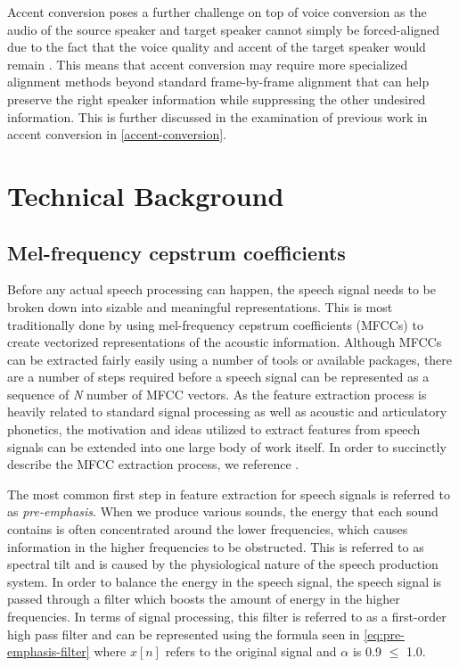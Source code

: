 \documentclass
[
    a4paper,
    twoside,
    12pt,
]
{report}
\begin{document}
Accent conversion poses a further challenge on top of voice conversion
as the audio of the source speaker and target speaker cannot simply be
forced-aligned due to the fact that the voice quality and accent of the
target speaker would remain \parencite{aryal2014}. This means that
accent conversion may require more specialized alignment methods beyond
standard frame-by-frame alignment that can help preserve the right
speaker information while suppressing the other undesired information.
This is further discussed in the examination of previous work in accent
conversion in \autoref{accent-conversion}.

\hypertarget{technical-background}{%
\section{Technical Background}\label{technical-background}}

\subsection{Mel-frequency cepstrum coefficients}

Before any actual speech processing can happen, the speech signal needs
to be broken down into sizable and meaningful representations. This is
most traditionally done by using mel-frequency cepstrum coefficients
(MFCCs) to create vectorized representations of the acoustic
information. Although MFCCs can be extracted fairly easily using a
number of tools or available packages, there are a number of steps
required before a speech signal can be represented as a sequence of
\emph{N} number of MFCC vectors. As the feature extraction process is
heavily related to standard signal processing as well as acoustic and
articulatory phonetics, the motivation and ideas utilized to extract
features from speech signals can be extended into one large body of work
itself. In order to succinctly describe the MFCC extraction process, we
reference \textcite{jurafsky2009}.

The most common first step in feature extraction for speech signals is
referred to as \emph{pre-emphasis}. When we produce various sounds, the
energy that each sound contains is often concentrated around the lower
frequencies, which causes information in the higher frequencies to be
obstructed. This is referred to as spectral tilt and is caused by the
physiological nature of the speech production system. In order to
balance the energy in the speech signal, the speech signal is passed
through a filter which boosts the amount of energy in the higher
frequencies. In terms of signal processing, this filter is referred to
as a first-order high pass filter and can be represented using the
formula seen in \autoref{eq:pre-emphasis-filter} where \(x[n]\) refers
to the original signal and \(\alpha\) is 0.9 \(\leq\) 1.0.
\end{document}
